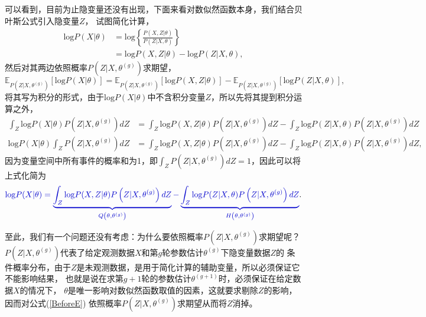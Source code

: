 \documentclass[UTF8]{ctexart}
\begin{document}
可以看到，目前为止隐变量还没有出现，下面来看对数似然函数本身，我们结合贝叶斯公式引入隐变量$Z$，
试图简化计算，
\begin{equation}\label{BeforeE}
  \begin{split}
    \mathrm{log}P(X|\theta) &= \mathrm{log} \left\{ \frac{P(X,Z|\theta)}{P(Z|X, \theta)}\right\}\\
    &= \mathrm{log}P(X,Z|\theta) - \mathrm{log}P(Z|X,\theta),
  \end{split}
\end{equation}
然后对其两边依照概率$P(Z|X,\theta^{(g)})$求期望，
\begin{equation}
  \mathbb{E}_{P(Z|X,\theta^{(g)})}\left[\mathrm{log}P(X|\theta)\right] = \mathbb{E}_{P(Z|X,\theta^{(g)})}\left[\mathrm{log}P(X,Z|\theta)\right] - \mathbb{E}_{P(Z|X,\theta^{(g)})}\left[\mathrm{log}P(Z|X,\theta)\right],
\end{equation}
将其写为积分的形式，由于$\mathrm{log}P(X|\theta)$中不含积分变量$Z$，所以先将其提到积分运算之外，
\begin{equation}\label{IntegerSimplify}
  \begin{split}
    \int_{Z}\mathrm{log}P(X|\theta)P\left(Z|X,\theta^{(g)}\right)dZ &= \int_{Z}\mathrm{log}P(X,Z|\theta)P\left(Z|X,\theta^{(g)}\right)dZ - \int_{Z}\mathrm{log}P(Z|X,\theta)P\left(Z|X,\theta^{(g)}\right)dZ\\
    \mathrm{log}P(X|\theta)\int_{Z}P\left(Z|X,\theta^{(g)}\right)dZ &= \int_{Z}\mathrm{log}P(X,Z|\theta)P\left(Z|X,\theta^{(g)}\right)dZ - \int_{Z}\mathrm{log}P(Z|X,\theta)P\left(Z|X,\theta^{(g)}\right)dZ,
  \end{split}
\end{equation}
因为变量空间中所有事件的概率和为1，即$\int_{Z}P(Z|X,\theta^{(g)})dZ = 1$，因此可以将上式化简为
\begin{equation}\label{QH}
  \textcolor[rgb]{0.0,0.0,0.8}{\mathrm{log}P(X|\theta) = \underbrace{\int_{Z}\mathrm{log}P(X,Z|\theta)P\left(Z|X,\theta^{(g)}\right)dZ}_{Q\left(\theta,\theta^{(g)}\right)} - \underbrace{\int_{Z}\mathrm{log}P(Z|X,\theta)P\left(Z|X,\theta^{(g)}\right)dZ}_{H\left(\theta, \theta^{(g)}\right)}}.
\end{equation}

至此，我们有一个问题还没有考虑：为什么要依照概率$P(Z|X,\theta^{(g)})$求期望呢？
$P(Z|X,\theta^{(g)})$代表了给定观测数据$X$和第$g$轮参数估计$\theta^{(g)}$下隐变量数据$Z$的
条件概率分布，由于$Z$是未观测数据，是用于简化计算的辅助变量，所以必须保证它不能影响结果，
也就是说在求第$g+1$轮的参数估计$\theta^{(g+1)}$时，必须保证在给定数据$X$的情况下，
$\theta$是唯一影响对数似然函数取值的因素，这就要求剔除$Z$的影响，
因而对公式(\ref{BeforeE}) 依照概率$P(Z|X,\theta^{(g)})$求期望从而将$Z$消掉。
\end{document}
